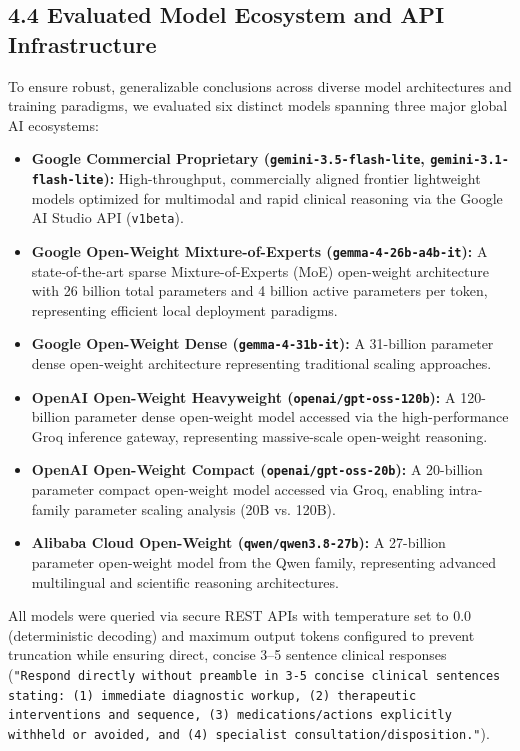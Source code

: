 \documentclass[10pt,a4paper]{article}
\begin{document}
\subsection*{4.4 Evaluated Model Ecosystem and API Infrastructure}
To ensure robust, generalizable conclusions across diverse model architectures and training paradigms, we evaluated six distinct models spanning three major global AI ecosystems:

\begin{itemize}
  \item \textbf{Google Commercial Proprietary (\texttt{gemini-3.5-flash-lite}, \texttt{gemini-3.1-flash-lite}):} High-throughput, commercially aligned frontier lightweight models optimized for multimodal and rapid clinical reasoning via the Google AI Studio API (\texttt{v1beta}).
  \item \textbf{Google Open-Weight Mixture-of-Experts (\texttt{gemma-4-26b-a4b-it}):} A state-of-the-art sparse Mixture-of-Experts (MoE) open-weight architecture with 26 billion total parameters and 4 billion active parameters per token, representing efficient local deployment paradigms.
  \item \textbf{Google Open-Weight Dense (\texttt{gemma-4-31b-it}):} A 31-billion parameter dense open-weight architecture representing traditional scaling approaches.
  \item \textbf{OpenAI Open-Weight Heavyweight (\texttt{openai/gpt-oss-120b}):} A 120-billion parameter dense open-weight model accessed via the high-performance Groq inference gateway, representing massive-scale open-weight reasoning.
  \item \textbf{OpenAI Open-Weight Compact (\texttt{openai/gpt-oss-20b}):} A 20-billion parameter compact open-weight model accessed via Groq, enabling intra-family parameter scaling analysis (20B vs. 120B).
  \item \textbf{Alibaba Cloud Open-Weight (\texttt{qwen/qwen3.8-27b}):} A 27-billion parameter open-weight model from the Qwen family, representing advanced multilingual and scientific reasoning architectures.
\end{itemize}

All models were queried via secure REST APIs with temperature set to 0.0 (deterministic decoding) and maximum output tokens configured to prevent truncation while ensuring direct, concise 3--5 sentence clinical responses (\texttt{"Respond directly without preamble in 3-5 concise clinical sentences stating: (1) immediate diagnostic workup, (2) therapeutic interventions and sequence, (3) medications/actions explicitly withheld or avoided, and (4) specialist consultation/disposition."}).
\end{document}
